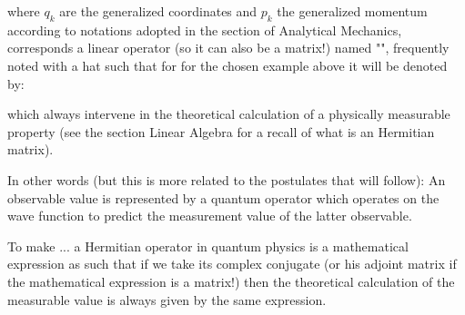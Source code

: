 	where $q_k$ are the generalized coordinates and $p_k$ the generalized momentum according to notations adopted in the section of Analytical Mechanics, corresponds a linear operator (so it can also be a matrix!) named "", frequently noted with a hat such that for for the chosen example above it will be denoted by:
	
	which always intervene in the theoretical calculation of a physically measurable property (see the section Linear Algebra for a recall of what is an Hermitian matrix).
	
	In other words (but this is more related to the postulates that will follow): An observable value is represented by a quantum operator which operates on the wave function to predict the measurement value of the latter observable.
	
	To make ... a Hermitian operator in quantum physics is a mathematical expression as such that if we take its complex conjugate (or his adjoint matrix if the mathematical expression is a matrix!) then the theoretical calculation of the measurable value is always given by the same expression.
	
